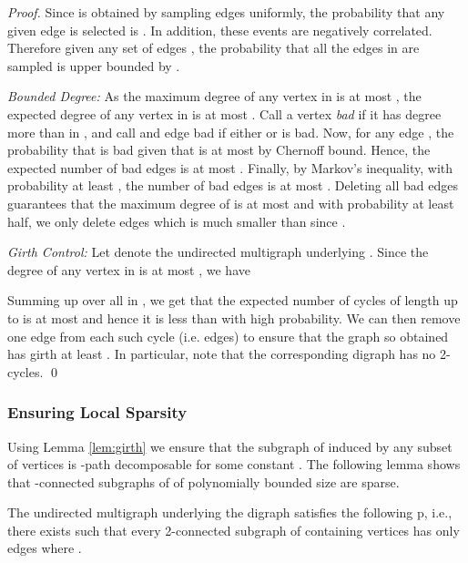 \documentclass[oribibl]{llncs}
\begin{document}
\begin{proof}
Since  is obtained by sampling  edges
uniformly, the probability that any given edge is selected is . In addition, these events are negatively
correlated. Therefore given any set of edges , the probability that all
the edges in  are sampled is upper bounded by .

\emph{Bounded Degree:} As the maximum degree of any vertex in  is
at most , the expected degree of any vertex  in  is
at most . Call a vertex  \emph{bad} if it has degree more than  in , and
call and edge  bad if either  or  is bad. Now, for
any edge , the probability that  is bad given that
 is at most  by Chernoff
bound. Hence, the expected number of bad edges is at most
. Finally, by Markov's inequality, with
probability at least , the number of bad edges is at most
. Deleting all bad edges guarantees that
the maximum degree of  is at most  and with probability
at least half, we only delete  edges which
is much smaller than  since .

\emph{Girth Control:} Let  denote the undirected multigraph underlying . Since the degree of any vertex in  is at most , we have


Summing up over all  in , we get that the expected number of cycles of length up to  is at most  and hence it is less than  with high probability. We can then remove one edge from each such cycle (i.e.  edges) to ensure that the graph  so obtained has girth at least . In particular, note that the corresponding digraph  has no 2-cycles.
\qed  
\end{proof}


\subsubsection{Ensuring Local Sparsity}
\label{sec:ensur-local-spars}
Using Lemma \ref{lem:girth} 
we ensure that the subgraph of  induced by any subset of 
 vertices is -path decomposable for some constant .
The following lemma shows that -connected subgraphs of  of
polynomially bounded size are sparse.
\begin{lemma} \label{lem:local-sparsity} The undirected multigraph
	 underlying the digraph  satisfies the following p,
	i.e., there exists  such that every 2-connected
	subgraph  of  containing 
vertices has only  edges where .
\end{lemma}
\end{document}

